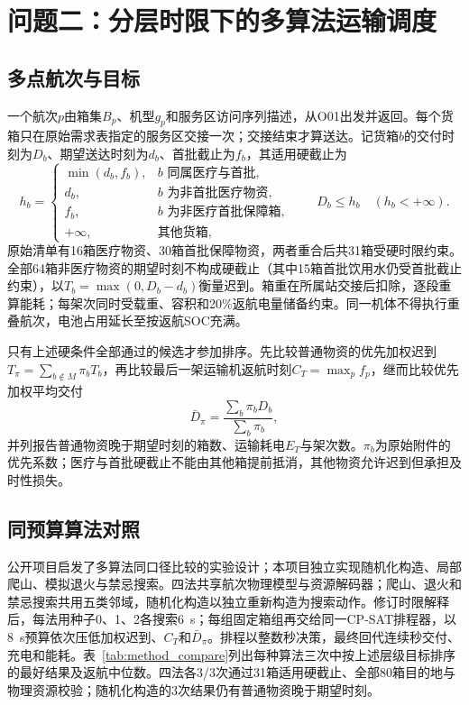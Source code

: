 \section{问题二：分层时限下的多算法运输调度}

\subsection{多点航次与目标}

一个航次$p$由箱集$B_p$、机型$g_p$和服务区访问序列描述，从O01出发并返回。每个货箱只在原始需求表指定的服务区交接一次；交接结束才算送达。记货箱$b$的交付时刻为$D_b$、期望送达时刻为$d_b$、首批截止为$f_b$，其适用硬截止为
\begin{equation}
h_b=\begin{cases}
\min(d_b,f_b),&b\text{ 同属医疗与首批},\\
d_b,&b\text{ 为非首批医疗物资},\\
f_b,&b\text{ 为非医疗首批保障箱},\\
+\infty,&\text{其他货箱},
\end{cases}
\qquad D_b\le h_b\quad(h_b<+\infty).
\label{eq:hard_delivery}
\end{equation}
原始清单有16箱医疗物资、30箱首批保障物资，两者重合后共31箱受硬时限约束。全部64箱非医疗物资的期望时刻不构成硬截止（其中15箱首批饮用水仍受首批截止约束），以$T_b=\max(0,D_b-d_b)$衡量迟到。箱重在所属站交接后扣除，逐段重算能耗；每架次同时受载重、容积和20\%返航电量储备约束。同一机体不得执行重叠航次，电池占用延长至按返航SOC充满。

只有上述硬条件全部通过的候选才参加排序。先比较普通物资的优先加权迟到$T_\pi=\sum_{b\notin M}\pi_bT_b$，再比较最后一架运输机返航时刻$C_T=\max_p f_p$，继而比较优先加权平均交付
\begin{equation}
\bar D_\pi=\frac{\sum_b\pi_bD_b}{\sum_b\pi_b},
\end{equation}
并列报告普通物资晚于期望时刻的箱数、运输耗电$E_T$与架次数。$\pi_b$为原始附件的优先系数；医疗与首批硬截止不能由其他箱提前抵消，其他物资允许迟到但承担及时性损失。

\subsection{同预算算法对照}

公开项目启发了多算法同口径比较的实验设计\cite{akun}；本项目独立实现随机化构造、局部爬山、模拟退火与禁忌搜索。四法共享航次物理模型与资源解码器；爬山、退火和禁忌搜索共用五类邻域，随机化构造以独立重新构造为搜索动作。修订时限解释后，每法用种子0、1、2各搜索6~s；每组固定箱组再交给同一CP-SAT排程器，以8~s预算依次压低加权迟到、$C_T$和$\bar D_\pi$。排程以整数秒决策，最终回代连续秒交付、充电和能耗。表~\ref{tab:method_compare}列出每种算法三次中按上述层级目标排序的最好结果及返航中位数。四法各3/3次通过31箱适用硬截止、全部80箱目的地与物理资源校验；随机化构造的3次结果仍有普通物资晚于期望时刻。

